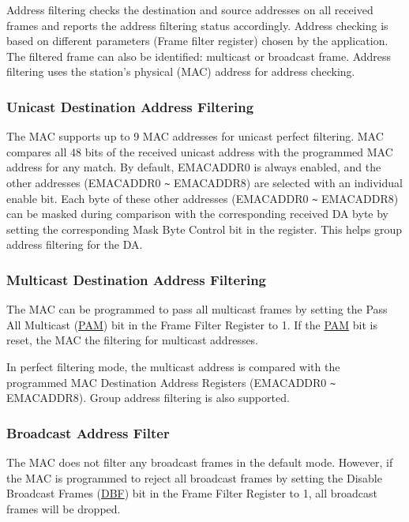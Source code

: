 \documentclass[main\_\_EN.tex]{subfiles}
\begin{document}
Address filtering checks the destination and source addresses on all received frames and reports the address filtering status accordingly. Address checking is based on different parameters (Frame filter register) chosen by the application. The filtered frame can also be identified: multicast or broadcast frame. Address filtering uses the station's physical (MAC) address for address checking.

\subsubsection{Unicast Destination Address Filtering}
The MAC supports up to 9 MAC addresses for unicast perfect filtering.  MAC compares all 48 bits of the received unicast address with the programmed MAC address for any match. By default, EMACADDR0 is always enabled, and the other addresses (EMACADDR0 \verb+~+ EMACADDR8) are selected with an individual enable bit. Each byte of these other addresses (EMACADDR0 \verb+~+ EMACADDR8) can be
masked during comparison with the corresponding received DA byte by setting the
corresponding Mask Byte Control bit in the register. This helps group address filtering for the
DA.

\subsubsection{Multicast Destination Address Filtering}
The MAC can be programmed to pass all multicast frames by setting the Pass All Multicast (\hyperref[regdesc:EMACFFREG]{PAM}) bit in the Frame Filter Register to 1. If the \hyperref[regdesc:EMACFFREG]{PAM} bit is reset, the MAC  the filtering for multicast addresses.

In perfect filtering mode, the multicast address is compared with the programmed MAC Destination Address Registers (EMACADDR0 \verb+~+ EMACADDR8). Group address filtering is also supported.

\subsubsection{Broadcast Address Filter}
The MAC does not filter any broadcast frames in the default mode. However, if the MAC is programmed to reject all broadcast frames by setting the Disable Broadcast Frames (\hyperref[regdesc:EMACFFREG]{DBF}) bit in the Frame Filter Register to 1, all broadcast frames will be dropped.
\end{document}
